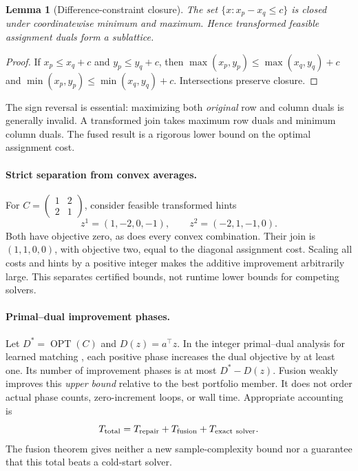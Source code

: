 \documentclass[10pt,letterpaper]{article}
\newtheorem{lemma}[theorem]{Lemma}
\newcommand{\opt}{\operatorname{OPT}}
\begin{document}
\begin{lemma}[Difference-constraint closure]
The set $\{x:x_p-x_q\leq c\}$ is closed under coordinatewise minimum and maximum. Hence transformed feasible assignment duals form a sublattice.
\end{lemma}
\begin{proof}
If $x_p\leq x_q+c$ and $y_p\leq y_q+c$, then $\max(x_p,y_p)\leq\max(x_q,y_q)+c$ and $\min(x_p,y_p)\leq\min(x_q,y_q)+c$. Intersections preserve closure.
\end{proof}

The sign reversal is essential: maximizing both \emph{original} row and column duals is generally invalid. A transformed join takes maximum row duals and minimum column duals. The fused result is a rigorous lower bound on the optimal assignment cost.

\paragraph{Strict separation from convex averages.}
For $C=\left(\begin{smallmatrix}1&2\\2&1\end{smallmatrix}\right)$, consider feasible transformed hints
\[
 z^1=(1,-2,0,-1),\qquad z^2=(-2,1,-1,0).
\]
Both have objective zero, as does every convex combination. Their join is $(1,1,0,0)$, with objective two, equal to the diagonal assignment cost. Scaling all costs and hints by a positive integer makes the additive improvement arbitrarily large. This separates certified bounds, not runtime lower bounds for competing solvers.

\paragraph{Primal--dual improvement phases.}
Let $D^*=\opt(C)$ and $D(z)=a^\top z$. In the integer primal--dual analysis for learned matching \citep{dinitz21,portfolios}, each positive phase increases the dual objective by at least one. Its number of improvement phases is at most $D^*-D(z)$. Fusion weakly improves this \emph{upper bound} relative to the best portfolio member. It does not order actual phase counts, zero-increment loops, or wall time. Appropriate accounting is
\[
 T_{\rm total}=T_{\rm repair}+T_{\rm fusion}+T_{\rm exact\ solver}.
\]
The fusion theorem gives neither a new sample-complexity bound nor a guarantee that this total beats a cold-start solver.
\end{document}
